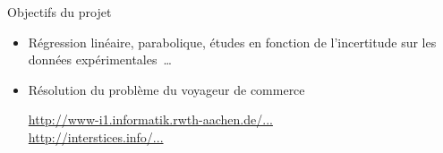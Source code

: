 \documentclass[t, compress]{beamer}
\begin{document}
\begin{frame}[c, fragile]{Objectifs du projet}

  \begin{itemize}

  \item Régression linéaire, parabolique, études en fonction de
    l'incertitude sur les données expérimentales~\ldots

  \item Résolution du problème du voyageur de commerce
    \begin{block}{}
      \centering
      \href{http://www-i1.informatik.rwth-aachen.de/~algorithmus/algo41.php}{http://www-i1.informatik.rwth-aachen.de/...} \\
      \href{http://interstices.info/jcms/c_43811/le-recuit-simule}{http://interstices.info/...}
    \end{block}

  \end{itemize}

\end{frame}
\end{document}
